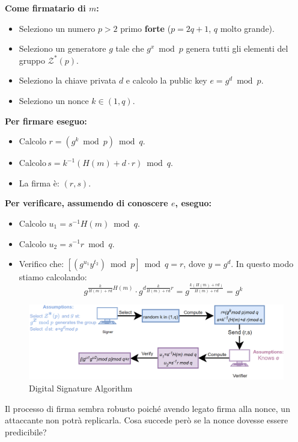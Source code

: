 \begin{definition}
\textbf{Come firmatario di $m$:}
\begin{itemize}
    \item Seleziono un numero $p>2$ primo \textbf{forte} ($p=2q+1$, $q$ molto grande).
    \item Seleziono un generatore $g$ tale che $g^x\bmod p$ genera tutti gli elementi del gruppo $\mathcal{Z}^*(p)$.
    \item Seleziono la chiave privata $d$ e calcolo la public key $e=g^d\bmod p$.
    \item Seleziono un nonce $k\in(1,q)$.
\end{itemize}
\textbf{Per firmare eseguo:}
\begin{itemize}
    \item Calcolo $r=(g^k\bmod p)\bmod q$.
    \item Calcolo\footnotemark \,$s=k^{-1}(H(m)+d\cdot r)\bmod q$.
    \item La firma è: $(r,s)$.
\end{itemize}
\textbf{Per verificare, assumendo di conoscere $e$, eseguo:}
\begin{itemize}
    \item Calcolo $u_1=s^{-1}H(m)\bmod q$.
    \item Calcolo $u_2=s^{-1}r\bmod q$.
    \item Verifico che: $[(g^{u_1}y^{t_2})\bmod p]\bmod q=r$, dove $y=g^d$. In questo modo stiamo calcolando:
    \[
    g^{\frac{k}{H(m)+rd}H(m)}\cdot g^{d\frac{k}{H(m)+rd}r}=g^{\frac{k(H(m)+rd)}{H(m)+rd}}=g^k
    \]
\end{itemize}
\end{definition}
\begin{figure}[h]
    \centering
    \includegraphics{image/ecc/dsa.png}
    \caption{Digital Signature Algorithm}
    \label{fig:dsa}
\end{figure}
Il processo di firma sembra robusto poiché avendo legato firma alla nonce, un attaccante non potrà replicarla. Cosa succede però se la nonce dovesse essere predicibile?
